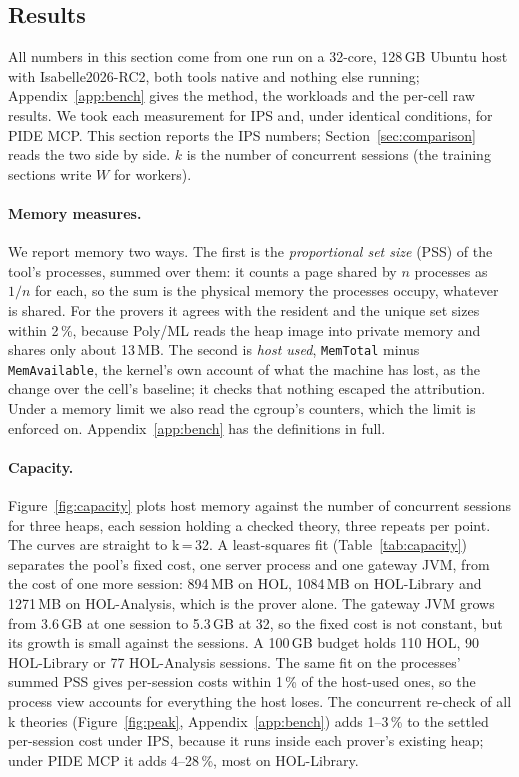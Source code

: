 \documentclass[11pt]{article}
\newcommand{\code}[1]{\colorbox{gray!12}{\texttt{\vphantom{Ag}#1}}}
\begin{document}
\subsection{Results}
\label{sec:serving-measured}

All numbers in this section come from one run on a 32-core, 128\,GB
Ubuntu host with Isabelle2026-RC2, both tools native and nothing else
running; Appendix~\ref{app:bench} gives the method, the workloads and the
per-cell raw results. We took each measurement for IPS and, under
identical conditions, for PIDE MCP. This section reports the IPS numbers;
Section~\ref{sec:comparison} reads the two side by side. $k$ is the
number of concurrent sessions (the training sections write $W$ for
workers).

\paragraph{Memory measures.} We report memory two ways. The first is the
\emph{proportional set size} (PSS) of the tool's processes, summed over
them: it counts a page shared by $n$ processes as $1/n$ for each, so the
sum is the physical memory the processes occupy, whatever is shared. For
the provers it agrees with the resident and the unique set sizes within
2\,\%, because Poly/ML reads the heap image into private memory and
shares only about 13\,MB. The second is \emph{host used},
\code{MemTotal} minus \code{MemAvailable}, the kernel's own account of
what the machine has lost, as the change over the cell's baseline; it
checks that nothing escaped the attribution. Under a memory limit we also
read the cgroup's counters, which the limit is enforced on.
Appendix~\ref{app:bench} has the definitions in full.

\paragraph{Capacity.} Figure~\ref{fig:capacity} plots host memory against
the number of concurrent sessions for three heaps, each session holding a
checked theory, three repeats per point. The curves are straight to
k\,=\,32. A least-squares fit (Table~\ref{tab:capacity}) separates the
pool's fixed cost, one server process and one gateway JVM, from the cost
of one more session: 894\,MB on HOL, 1084\,MB on HOL-Library and
1271\,MB on HOL-Analysis, which is the prover alone. The gateway JVM
grows from 3.6\,GB at one session to 5.3\,GB at 32, so the fixed cost is
not constant, but its growth is small against the sessions. A 100\,GB
budget holds 110 HOL, 90 HOL-Library or 77 HOL-Analysis sessions. The
same fit on the processes' summed PSS gives per-session costs within 1\,\%
of the host-used ones, so the process view accounts for everything the
host loses. The concurrent re-check of all k theories
(Figure~\ref{fig:peak}, Appendix~\ref{app:bench}) adds 1--3\,\% to the
settled per-session cost under IPS, because it runs inside each prover's
existing heap; under PIDE MCP it adds 4--28\,\%, most on HOL-Library.
\end{document}
